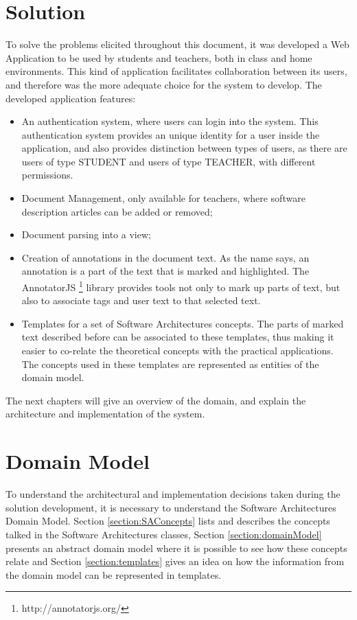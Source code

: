 \documentclass{llncs}
\begin{document}
\section{Solution}
\label{solution}
To solve the problems elicited throughout this document, it was developed a Web Application to be used by students and teachers, both in class and home environments. This kind of application facilitates collaboration between its users, and therefore was the more adequate choice for the system to develop. The developed application features:
\begin{itemize}
\item An authentication system, where users can login into the system. This authentication system provides an unique identity for a user inside the application, and also provides distinction between types of users, as there are users of type STUDENT and users of type TEACHER, with different permissions.
\item Document Management, only available for teachers, where software description articles can be added or removed;
\item Document parsing into a view;
\item Creation of annotations in the document text. As the name says, an annotation is a part of the text that is marked and highlighted. The AnnotatorJS \footnote{http://annotatorjs.org/} library provides tools not only to mark up parts of text, but also to associate tags and user text to that selected text. 
\item Templates for a set of Software Architectures concepts. The parts of marked text described before can be associated to these templates, thus making it easier to co-relate the theoretical concepts with the practical applications. The concepts used in these templates are represented as entities of the domain model.

\end{itemize}

The next chapters will give an overview of the domain, and explain the architecture and implementation of the system.
\section{Domain Model}
\label{domainModel}
To understand the architectural and implementation decisions taken during the solution development, it is necessary to understand the Software Architectures Domain Model. Section \ref{section:SAConcepts} lists and describes the concepts talked in the Software Architectures classes, Section \ref{section:domainModel} presents an abstract domain model where it is possible to see how these concepts relate and Section \ref{section:templates} gives an idea on how the information from the domain model can be represented in templates.
\end{document}
